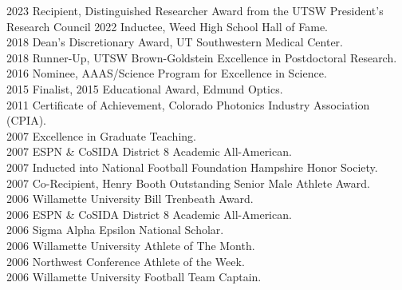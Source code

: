 2023 \hspace{58pt} Recipient, Distinguished Researcher Award from the UTSW President’s Research Council
2022 \hspace{58pt} Inductee, Weed High School Hall of Fame. \\
2018 \hspace{58pt} Dean's Discretionary Award, UT Southwestern Medical Center.  \\
2018 \hspace{58pt} Runner-Up, UTSW Brown-Goldstein Excellence in Postdoctoral Research. \\
2016 \hspace{58pt} Nominee, AAAS/Science Program for Excellence in Science.  \\
2015 \hspace{58pt} Finalist, 2015 Educational Award, Edmund Optics. \\
2011 \hspace{58pt} Certificate of Achievement, Colorado Photonics Industry Association (CPIA). \\
2007 \hspace{58pt} Excellence in Graduate Teaching. \\
2007 \hspace{58pt} ESPN \& CoSIDA District 8 Academic All-American. \\
2007 \hspace{58pt} Inducted into National Football Foundation Hampshire Honor Society.  \\
2007 \hspace{58pt} Co-Recipient, Henry Booth Outstanding Senior Male Athlete Award. \\
2006 \hspace{58pt} Willamette University Bill Trenbeath Award. \\
2006 \hspace{58pt} ESPN \& CoSIDA District 8 Academic All-American. \\
2006 \hspace{58pt} Sigma Alpha Epsilon National Scholar. \\
2006 \hspace{58pt} Willamette University Athlete of The Month.\\
2006 \hspace{58pt} Northwest Conference Athlete of the Week. \\
2006 \hspace{58pt} Willamette University Football Team Captain. \\
